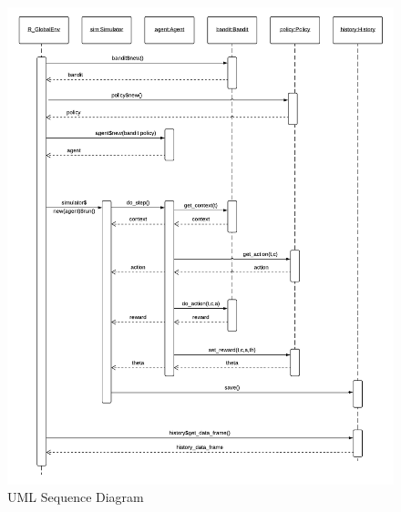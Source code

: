 \documentclass{jss}\usepackage[]{graphicx}\usepackage[]{color}
\begin{document}
\begin{figure}[H]
  \centering
    \includegraphics[width=.99\textwidth]{fig/contextual_sequence}

      \caption{ UML Sequence Diagram}
      \label{fig:contextual_sequence}
\end{figure}
\end{document}
